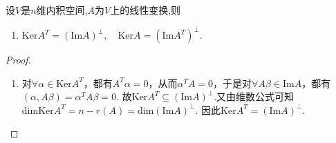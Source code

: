 \documentclass[../../main.tex]{subfiles}%
\begin{document}
\begin{proposition}\label{proposition:一些常见的正交补空间}
设$V$是$n$维内积空间,$A$为$V$上的线性变换,则
\begin{enumerate}
\item $\mathrm{Ker}A^T=\left( \mathrm{Im}A \right) ^{\bot} ,\quad\mathrm{Ker}A=\left( \mathrm{Im}A^T \right) ^{\bot}.$

\end{enumerate}
\end{proposition}
\begin{proof}
\begin{enumerate}
\item 对$\forall \alpha \in \mathrm{Ker}A^T$，都有$A^T\alpha =0$，从而$\alpha ^TA=0$，于是对$\forall A\beta \in \mathrm{Im}A$，都有
$\left( \alpha ,A\beta \right) =\alpha ^TA\beta =0.$
故$\mathrm{Ker}A^T\subseteq \left( \mathrm{Im}A \right) ^{\bot}$.又由维数公式可知
$\mathrm{dimKer}A^T=n-r\left( A \right) =\mathrm{dim}\left( \mathrm{Im}A \right) ^{\bot}.$
因此$\mathrm{Ker}A^T=\left( \mathrm{Im}A \right) ^{\bot}.$

\end{enumerate}

\end{proof}
\end{document}
